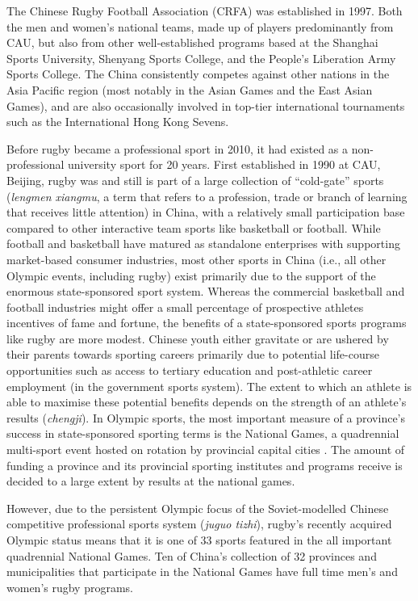     The Chinese Rugby Football Association (CRFA) was established in 1997. Both the men and women’s national teams, made up of players predominantly from CAU, but also from other well-established programs based at the Shanghai Sports University, Shenyang Sports College, and the People’s Liberation Army Sports College.  The China consistently competes against other nations in the Asia Pacific region (most notably in the Asian Games and the East Asian Games), and are also occasionally involved in top-tier international tournaments such as the International Hong Kong Sevens.

    Before rugby became a professional sport in 2010, it had existed as a non-professional university sport for 20 years.  First established in 1990 at CAU, Beijing, rugby was and still is part of a large collection of ``cold-gate'' sports (\textit{lengmen xiangmu}, a term that refers to a profession, trade or branch of learning that receives little attention) in China, with a relatively small participation base compared to other interactive team sports like basketball or football.  While football and basketball have matured as standalone enterprises with supporting market-based consumer industries, most other sports in China (i.e., all other Olympic events, including rugby) exist primarily due to the support of the enormous state-sponsored sport system.  Whereas the commercial basketball and football industries might offer a small percentage of prospective athletes incentives of fame and fortune, the benefits of a state-sponsored sports programs like rugby are more modest.  Chinese youth either gravitate or are ushered by their parents towards sporting careers primarily due to potential life-course opportunities such as access to tertiary education and post-athletic career employment (in the government sports system).  The extent to which an athlete is able to maximise these potential benefits depends on the strength of an athlete's results (\textit{chengji}).
    In Olympic sports, the most important measure of a province's success in state-sponsored sporting terms is the National Games, a quadrennial multi-sport event hosted on rotation by provincial capital cities \citep{Hong2002}.  The amount of funding a province and its provincial sporting institutes and programs receive is decided to a large extent by results at the national games.

    However, due to the persistent Olympic focus of the Soviet-modelled Chinese competitive professional sports system (\textit{juguo tizhi}), rugby's recently acquired Olympic status means that it is one of 33 sports featured in the all important quadrennial National Games.  Ten of China's collection of 32 provinces and municipalities that participate in the National Games have full time men's and women's rugby programs.

